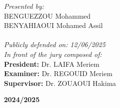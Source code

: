 \begin{spacing}{1.5}
  \noindent
  \textit{Presented by:} \\
  BENGUEZZOU Mohammed \\
  BENYAHIAOUI Mohamed Assil\\
  ~~\\
  \textit{Publicly defended on: 12/06/2025} \\
  \textit{In front of the jury composed of:} \\
  \textbf{President:} Dr. LAIFA Meriem \\
  \textbf{Examiner:} Dr. REGOUID Meriem \\
  \textbf{Supervisor:} Dr. ZOUAOUI Hakima \\
  \centerline{\textbf{2024/2025}}

\end{spacing}



